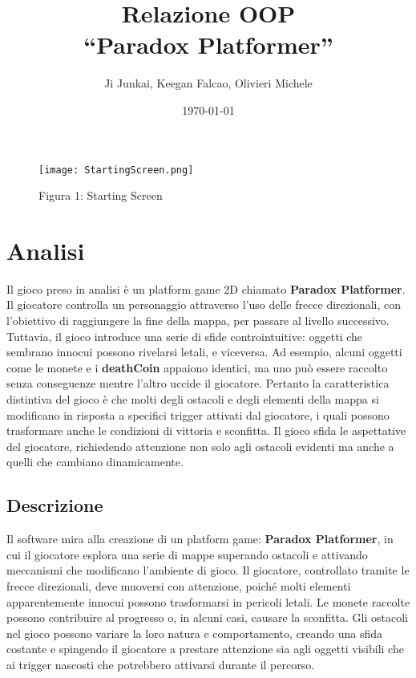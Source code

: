 \documentclass[a4paper,12pt]{report}
\title{Relazione OOP\\``Paradox Platformer''}
\author{Ji Junkai, Keegan Falcao, Olivieri Michele}
\date{\today}
\begin{document}
	
	\maketitle
	
	\tableofcontents
	
	\begin{figure}[H]
		\centering
		\texttt{[image: StartingScreen.png]}
		\caption{Figura 1: Starting Screen}
	\end{figure}
	
	\chapter{Analisi}
	
	Il gioco preso in analisi è un platform game 2D chiamato \textbf{Paradox Platformer}. Il giocatore controlla un personaggio attraverso l'uso delle frecce direzionali, con l'obiettivo di raggiungere la fine della mappa, per passare al livello successivo. Tuttavia, il gioco introduce una serie di sfide controintuitive: oggetti che sembrano innocui possono rivelarsi letali, e viceversa. Ad esempio, alcuni oggetti come le monete e i \textbf{deathCoin} appaiono identici, ma uno può essere raccolto senza conseguenze mentre l'altro uccide il giocatore. Pertanto la caratteristica distintiva del gioco è che molti degli ostacoli e degli elementi della mappa si modificano in risposta a specifici trigger attivati dal giocatore, i quali possono trasformare anche le condizioni di vittoria e sconfitta. Il gioco sfida le aspettative del giocatore, richiedendo attenzione non solo agli ostacoli evidenti ma anche a quelli che cambiano dinamicamente.
	
	\section{Descrizione}
	
	Il software mira alla creazione di un platform game: \textbf{Paradox Platformer}, in cui il giocatore esplora una serie di mappe superando ostacoli e attivando meccanismi che modificano l’ambiente di gioco. Il giocatore, controllato tramite le frecce direzionali, deve muoversi con attenzione, poiché molti elementi apparentemente innocui possono trasformarsi in pericoli letali. Le monete raccolte possono contribuire al progresso o, in alcuni casi, causare la sconfitta. Gli ostacoli nel gioco possono variare la loro natura e comportamento, creando una sfida costante e spingendo il giocatore a prestare attenzione sia agli oggetti visibili che ai trigger nascosti che potrebbero attivarsi durante il percorso.
	
\end{document}
